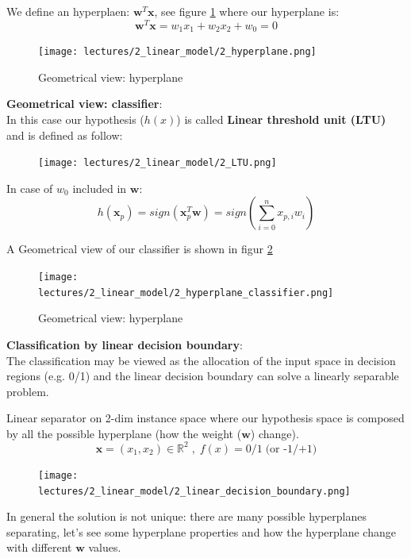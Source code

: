 \documentclass[../main.tex]{subfiles}
\begin{document}
We define an hyperplaen: $\mathbf{w}^T\mathbf{x}$, see figure \ref{fig:2_hyperplane} where our hyperplane is:
$$ \mathbf{w}^T\mathbf{x} = w_1x_1 + w_2x_2 +w_0 = 0$$
\begin{figure}[ht]
    \centering
    \texttt{[image: lectures/2\_linear\_model/2\_hyperplane.png]}
    \caption{Geometrical view: hyperplane}
    \label{fig:2_hyperplane}
\end{figure}


\noindent \textbf{Geometrical view: classifier}:\\
In this case our hypothesis ($h(x)$) is called \textbf{Linear threshold unit (LTU)} and is defined as follow:
\begin{figure}[H]
    \centering
    \texttt{[image: lectures/2\_linear\_model/2\_LTU.png]}
\end{figure}
In case of $w_0$ included in $\mathbf{w}$:
$$ h(\mathbf{x}_p) = sign(\mathbf{x}^T_p\mathbf{w}) = sign(\sum_{i = 0}^{n}x_{p,i}w_i)$$

\noindent A Geometrical view of our classifier is shown in figur \ref{fig:2_hyperplane_classifier}
\begin{figure}[ht]
    \centering
    \texttt{[image: lectures/2\_linear\_model/2\_hyperplane\_classifier.png]}
    \caption{Geometrical view: hyperplane}
    \label{fig:2_hyperplane_classifier}
\end{figure}

\noindent \textbf{Classification by linear decision boundary}:\\
The classification may be viewed as the allocation of the input space in decision regions (e.g. 0/1) and the linear decision boundary can solve a linearly separable problem.

\begin{example}
    Linear separator on 2-dim instance space where our hypothesis space is composed by all the possible hyperplane (how the weight ($\mathbf{w}$) change).
$$\mathbf{x} = (x_1, x_2) \in \mathbb{R}^2 \;,\; f(x) = 0/1 \; \text{(or  -1/+1)}$$
\begin{figure}[H]
    \centering
    \texttt{[image: lectures/2\_linear\_model/2\_linear\_decision\_boundary.png]}
\end{figure}
\end{example}
In general the solution is not unique: there are many possible hyperplanes separating, let's see some hyperplane properties and how the hyperplane change with different $\mathbf{w}$ values.
\end{document}
